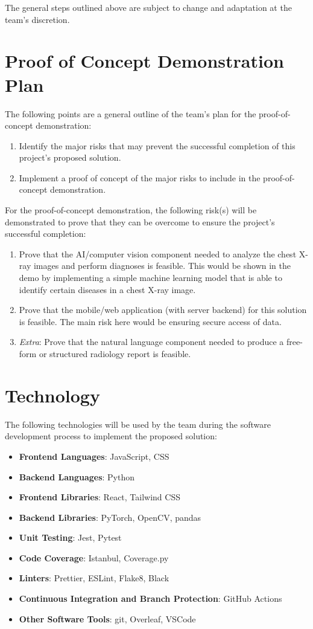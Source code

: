 \documentclass{article}
\begin{document}
\noindent The general steps outlined above are subject to change and adaptation at the team’s discretion.

\section{Proof of Concept Demonstration Plan}

The following points are a general outline of the team’s plan for the proof-of-concept demonstration:
\begin{enumerate}
\item Identify the major risks that may prevent the successful completion of this project’s proposed solution.
\item Implement a proof of concept of the major risks to include in the proof-of-concept demonstration. \\
\end{enumerate}

\noindent For the proof-of-concept demonstration, the following risk(s) will be demonstrated to prove that they can be overcome to ensure the project’s successful completion:
\begin{enumerate}
\item Prove that the AI/computer vision component needed to analyze the chest X-ray images and perform diagnoses is feasible. This would be shown in the demo by implementing a simple machine learning model that is able to identify certain diseases in a chest X-ray image.
\item Prove that the mobile/web application (with server backend) for this solution is feasible. The main risk here would be ensuring secure access of data.
\item \textit{Extra}: Prove that the natural language component needed to produce a free-form or structured radiology report is feasible.
\end{enumerate}

\section{Technology}

The following technologies will be used by the team during the software development process to implement the proposed solution:
\begin{itemize}
\item \textbf{Frontend Languages}: JavaScript, CSS
\item \textbf{Backend Languages}: Python
\item \textbf{Frontend Libraries}: React, Tailwind CSS
\item \textbf{Backend Libraries}: PyTorch, OpenCV, pandas
\item \textbf{Unit Testing}: Jest, Pytest
\item \textbf{Code Coverage}: Istanbul, Coverage.py
\item \textbf{Linters}: Prettier, ESLint, Flake8, Black
\item \textbf{Continuous Integration and Branch Protection}: GitHub Actions
\item \textbf{Other Software Tools}: git, Overleaf, VSCode
\end{itemize}
\end{document}
